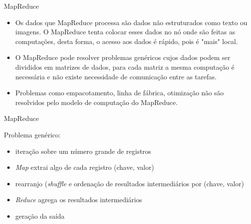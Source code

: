   \begin{frame}{MapReduce}

     \begin{itemize}
       \item<1-> Os dados que MapReduce processa são dados não estruturados como texto ou imagens. O MapReduce tenta colocar esses dados no nó onde são feitas as computações, desta forma, o acesso aos dados é rápido, pois é "mais" local.
       \item<2-> O MapReduce pode resolver problemas genéricos cujos dados podem ser divididos em matrizes de dados, para cada matriz a mesma computação é necessária e não existe necessidade de comunicação entre as tarefas.
       \item<3-> Problemas como empacotamento, linha de fábrica, otimização não são resolvidos pelo modelo de computação do MapReduce.
     \end{itemize}

  \end{frame}

  \begin{frame}{MapReduce}

Problema genérico:
\begin{itemize}
   \item iteração sobre um número grande de registros
   \item \emph{Map} extrai algo de cada registro (chave, valor)
   \item rearranjo (\emph{shuffle} e ordenação de resultados intermediários por (chave, valor)
   \item \emph{Reduce} agrega os resultados intermediários 
   \item geração da saída
\end{itemize}

  \end{frame}

